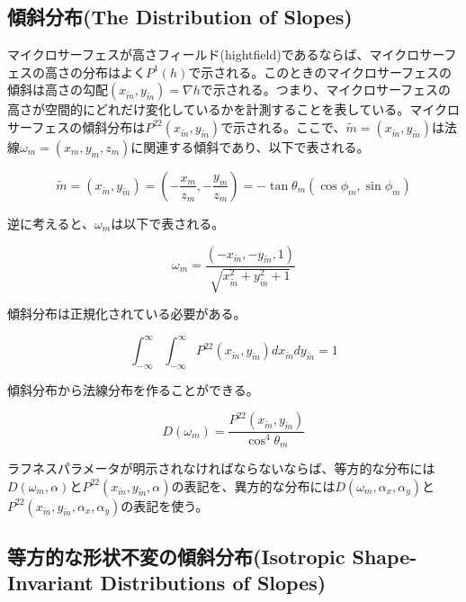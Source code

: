 \documentclass[a4j,xelatex,ja=standard]{bxjsarticle}
\begin{document}
\subsection{傾斜分布(The Distribution of Slopes)}

マイクロサーフェスが高さフィールド(hightfield)であるならば、マイクロサーフェスの高さの分布はよく$P^1(h)$で示される。このときのマイクロサーフェスの傾斜は高さの勾配$(x_{\tilde{m}}, y_{\tilde{m}}) = \nabla h$で示される。つまり、マイクロサーフェスの高さが空間的にどれだけ変化しているかを計測することを表している。マイクロサーフェスの傾斜分布は$P^{22}(x_{\tilde{m}}, y_{\tilde{m}})$で示される。ここで、$\tilde{m} = (x_{\tilde{m}}, y_{\tilde{m}})$は法線$\omega_m = (x_m, y_m, z_m)$に関連する傾斜であり、以下で表される。

\begin{equation}
    \tilde{m} = (x_{\tilde{m}}, y_{\tilde{m}}) = (-\frac{x_m}{z_m}, -\frac{y_m}{z_m}) = -\tan\theta_m(\cos\phi_m, \sin\phi_m)
    \label{eq:61}
\end{equation}

逆に考えると、$\omega_m$は以下で表される。

\begin{equation}
    \omega_m = \frac{(-x_{\tilde{m}}, -y_{\tilde{m}}, 1)}{\sqrt{x_{\tilde{m}}^2 + y_{\tilde{m}}^2 + 1}}
    \label{eq:62}
\end{equation}

傾斜分布は正規化されている必要がある。

\begin{equation}
    \int_{-\infty}^{\infty} \int_{-\infty}^{\infty} P^{22}(x_{\tilde{m}}, y_{\tilde{m}}) dx_{\tilde{m}} dy_{\tilde{m}} = 1
    \label{eq:63}
\end{equation}

傾斜分布から法線分布を作ることができる。

\begin{equation}
    D(\omega_m) = \frac{P^{22}(x_{\tilde{m}}, y_{\tilde{m}})}{\cos^{4} \theta_m}
    \label{eq:64}
\end{equation}

ラフネスパラメータが明示されなければならないならば、等方的な分布には$D(\omega_m, \alpha)$と$P^{22}(x_{\tilde{m}}, y_{\tilde{m}}, \alpha)$の表記を、異方的な分布には$D(\omega_m, \alpha_x, \alpha_y)$と$P^{22}(x_{\tilde{m}}, y_{\tilde{m}}, \alpha_x, \alpha_y)$の表記を使う。

\subsection{等方的な形状不変の傾斜分布(Isotropic Shape-Invariant Distributions of Slopes)}
\end{document}

